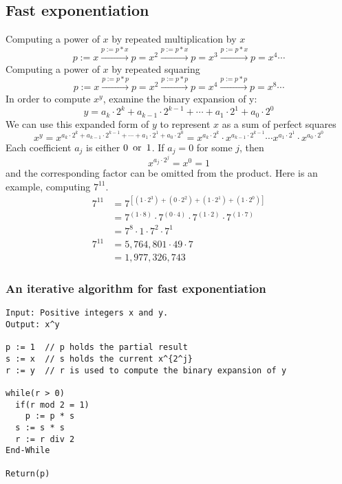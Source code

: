 \subsection{Fast exponentiation}
Computing a power of $x$ by repeated multiplication by $x$
\[
  p:=x \xrightarrow{p:=p*x} p = x^2 \xrightarrow{p:=p*x} p = x^3 \xrightarrow{p:=p*x} p=x^4 \cdots
\]
Computing a power of $x$ by repeated squaring
\[
  p:=x \xrightarrow{p:=p*p} p=x^2 \xrightarrow{p:=p*p} p=x^4 \xrightarrow{p:=p*p} p=x^8 \cdots
\]
In order to compute $x^y$, examine the binary expansion of y:
\[
  y = a_k \cdot 2^k + a_{k-1} \cdot 2^{k-1} + \cdots + a_1 \cdot 2^1 + a_0 \cdot 2^0
\]
We can use this expanded form of $y$ to represent $x$ as a sum of perfect squares
\[
  x^y = x^{a_k \cdot 2^k + a_{k-1} \cdot 2^{k-1} + \cdots + a_1 \cdot 2^1 + a_0 \cdot 2^0} = x^{a_{k} \cdot 2^{k}} \cdot x^{a_{k-1} \cdot 2^{k-1}} \cdots x^{a_{1} \cdot 2^{1}} \cdot x^{a_{0} \cdot 2^{0}}
\]
Each coefficient $a_j$ is either $0 \operatorname{~\text{or}~} 1$. If $a_j = 0$ for some $j$, then
\[
  x^{a_j \cdot 2^j} = x^0 = 1
\]
and the corresponding factor can be omitted from the product. Here is an example, computing $7^{11}$.
\begin{align*}
  7^{11} & = 7^{[(1 \cdot 2^3) + (0 \cdot 2^2) + (1 \cdot 2^1) + (1 \cdot 2^0)]}               \\
         & = 7^{(1 \cdot 8)} \cdot 7^{(0 \cdot 4)} \cdot 7^{(1 \cdot 2)} \cdot 7^{(1 \cdot 7)} \\
         & = 7^8 \cdot 1 \cdot 7^2 \cdot 7^1                                                   \\
  7^11   & = 5,764,801 \cdot 49 \cdot 7                                                        \\
         & = 1,977,326,743
\end{align*}

\subsubsection*{An iterative algorithm for fast exponentiation}
\begin{lstlisting}
Input: Positive integers x and y.
Output: x^y

p := 1  // p holds the partial result
s := x  // s holds the current x^{2^j}
r := y  // r is used to compute the binary expansion of y

while(r > 0)
  if(r mod 2 = 1)
    p := p * s
  s := s * s
  r := r div 2
End-While

Return(p)
\end{lstlisting}

